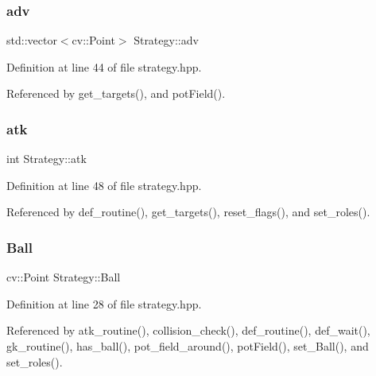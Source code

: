 \mbox{\label{class_strategy_a4ebbce7f034aaca32adbd4f9607642d9}} 
\subsubsection{\texorpdfstring{adv}{adv}}
{\footnotesize\ttfamily std\+::vector$<$cv\+::\+Point$>$ Strategy\+::adv}



Definition at line 44 of file strategy.\+hpp.



Referenced by get\+\_\+targets(), and pot\+Field().

\mbox{\label{class_strategy_af06cfb5e28b7a30cfaa312c7a1c051b1}} 
\subsubsection{\texorpdfstring{atk}{atk}}
{\footnotesize\ttfamily int Strategy\+::atk}



Definition at line 48 of file strategy.\+hpp.



Referenced by def\+\_\+routine(), get\+\_\+targets(), reset\+\_\+flags(), and set\+\_\+roles().

\mbox{\label{class_strategy_abd16b6276e747f6cd99a19963ff5495b}} 
\subsubsection{\texorpdfstring{Ball}{Ball}}
{\footnotesize\ttfamily cv\+::\+Point Strategy\+::\+Ball}



Definition at line 28 of file strategy.\+hpp.



Referenced by atk\+\_\+routine(), collision\+\_\+check(), def\+\_\+routine(), def\+\_\+wait(), gk\+\_\+routine(), has\+\_\+ball(), pot\+\_\+field\+\_\+around(), pot\+Field(), set\+\_\+\+Ball(), and set\+\_\+roles().

\mbox{\label{class_strategy_a595a6feb9d4a1e3c36185faba232f0d9}} 
